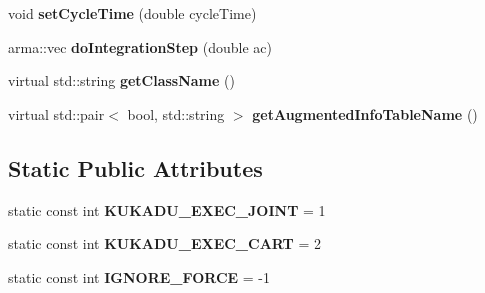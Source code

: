 \begin{DoxyCompactItemize}
\item 
void {\bfseries set\+Cycle\+Time} (double cycle\+Time)\hypertarget{classkukadu_1_1DMPExecutor_a652daf8f551d27361a43a880e9d9a1ff}{}\label{classkukadu_1_1DMPExecutor_a652daf8f551d27361a43a880e9d9a1ff}

\item 
arma\+::vec {\bfseries do\+Integration\+Step} (double ac)\hypertarget{classkukadu_1_1DMPExecutor_adb5e00c9c60ffddee9e1b0e019a4ee12}{}\label{classkukadu_1_1DMPExecutor_adb5e00c9c60ffddee9e1b0e019a4ee12}

\item 
virtual std\+::string {\bfseries get\+Class\+Name} ()\hypertarget{classkukadu_1_1DMPExecutor_a06c74ebf985d895023e50c857a9e1fb8}{}\label{classkukadu_1_1DMPExecutor_a06c74ebf985d895023e50c857a9e1fb8}

\item 
virtual std\+::pair$<$ bool, std\+::string $>$ {\bfseries get\+Augmented\+Info\+Table\+Name} ()\hypertarget{classkukadu_1_1DMPExecutor_ae5afa3d1d00448d5f93b5ebd61b7897e}{}\label{classkukadu_1_1DMPExecutor_ae5afa3d1d00448d5f93b5ebd61b7897e}

\end{DoxyCompactItemize}
\subsection*{Static Public Attributes}
\begin{DoxyCompactItemize}
\item 
static const int {\bfseries K\+U\+K\+A\+D\+U\+\_\+\+E\+X\+E\+C\+\_\+\+J\+O\+I\+NT} = 1\hypertarget{classkukadu_1_1DMPExecutor_a4d1aa7315001e2e1ea4ceb22d564f5af}{}\label{classkukadu_1_1DMPExecutor_a4d1aa7315001e2e1ea4ceb22d564f5af}

\item 
static const int {\bfseries K\+U\+K\+A\+D\+U\+\_\+\+E\+X\+E\+C\+\_\+\+C\+A\+RT} = 2\hypertarget{classkukadu_1_1DMPExecutor_a411b6f06a54d54edf5dd071530323284}{}\label{classkukadu_1_1DMPExecutor_a411b6f06a54d54edf5dd071530323284}

\item 
static const int {\bfseries I\+G\+N\+O\+R\+E\+\_\+\+F\+O\+R\+CE} = -\/1\hypertarget{classkukadu_1_1DMPExecutor_a7c95850684d0431a4a554b8ecf3dbe62}{}\label{classkukadu_1_1DMPExecutor_a7c95850684d0431a4a554b8ecf3dbe62}

\end{DoxyCompactItemize}
